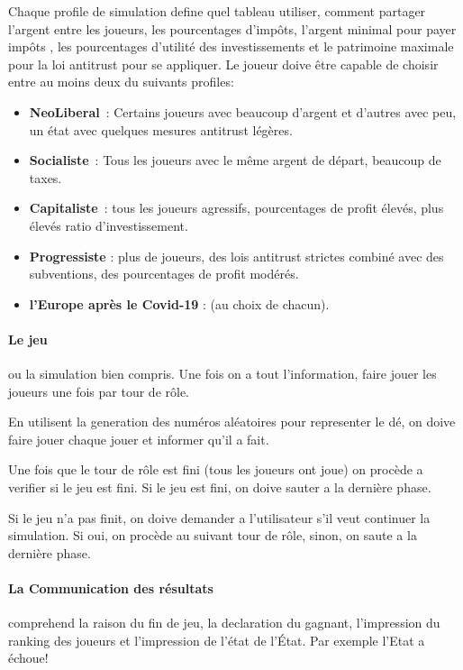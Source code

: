 \documentclass[12pt]{article}
\begin{document}
  Chaque profile de simulation define quel tableau utiliser, comment partager l'argent entre les joueurs, les pourcentages d'impôts, l'argent minimal pour payer impôts , les pourcentages d'utilité des investissements et le patrimoine maximale pour la loi antitrust pour se appliquer. 
  Le joueur doive être capable de choisir entre au moins deux du suivants profiles: 
  \begin{itemize}
  	\item \textbf{NeoLiberal}~: Certains joueurs avec beaucoup d'argent et d'autres avec peu, un état avec quelques
mesures antitrust légères.
  	\item \textbf{Socialiste}~: Tous les joueurs avec le même argent de départ, beaucoup de taxes.
  	\item \textbf{Capitaliste}~: tous les joueurs agressifs, pourcentages de profit élevés, plus élevés
ratio d'investissement.
  	\item \textbf{Progressiste} : plus de joueurs, des lois antitrust strictes
combiné avec des subventions, des pourcentages de profit modérés.
  	\item \textbf{l'Europe après le Covid-19} : (au choix de chacun).
\end{itemize}
 
 
  \paragraph{Le jeu} ou la simulation bien compris. 
  	Une fois on a tout l'information, faire jouer les joueurs une fois par tour de rôle.
	
	 En utilisent la generation des numéros aléatoires pour representer le dé, on doive faire jouer chaque jouer et informer qu'il a fait.
	 
	 Une fois que le tour de rôle est fini (tous les joueurs ont joue) on procède a verifier si le jeu est fini. Si le jeu est fini, on doive sauter a la dernière phase. 
	 
	 Si le jeu n'a pas finit, on doive demander a l'utilisateur s'il veut continuer la simulation. Si oui, on procède au suivant tour de rôle, sinon, on saute a la dernière phase.
	
  
  \paragraph{La Communication des résultats} comprehend la raison du fin de jeu, la declaration du gagnant, l'impression  du ranking des joueurs et l'impression de l'état de l'État. 
  	Par exemple
\begingroup\makeatletter\def\@currenvir{verbatim}
\verbatim
	  l'Etat a échoue! 
	
\end{document}

